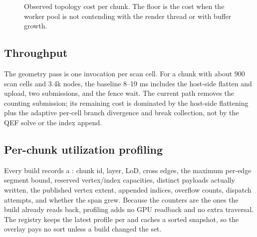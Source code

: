 \begin{figure}[htbp]
\centering
{}
\caption{Observed topology cost per chunk.  The floor is the cost when the
worker pool is not contending with the render thread or with buffer
growth.}
\label{fig:perf}
\end{figure}

\subsection{Throughput}

The geometry pass is one invocation per scan cell.  For a chunk with about
900 scan cells and 3.4k nodes, the baseline 8--19 ms includes the host-side
flatten and upload, two submissions, and the fence wait.  The current path
removes the counting submission; its remaining cost is dominated by the
host-side flattening plus the adaptive per-cell branch divergence and break
collection, not by the QEF solve or the index append.

\subsection{Per-chunk utilization profiling}

Every build records a : chunk id, layer, LoD, cross
edges, the maximum per-edge segment bound, reserved vertex/index capacities,
distinct payloads actually written, the published vertex extent, appended
indices, overflow counts, dispatch attempts, and whether the span grew.
Because the counters are the ones the build already reads back, profiling
adds no GPU readback and no extra traversal.  The registry keeps the latest
profile per  and caches a sorted snapshot, so the
overlay pays no sort unless a build changed the set.

